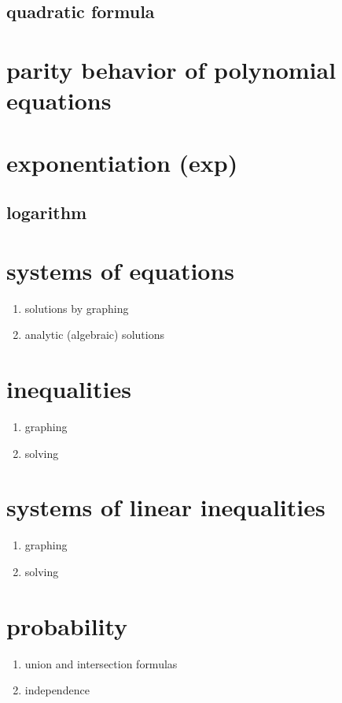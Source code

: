\documentclass[12pt,paper=letter]{scrartcl}
\begin{document}
    \subsection{quadratic formula}


    \section{parity behavior of polynomial equations}


    \section{exponentiation (exp)}

    \subsection{logarithm}


    \section{systems of equations}
    \begin{enumerate}
        \item solutions by graphing
        \item analytic (algebraic) solutions
    \end{enumerate}


    \section{inequalities}
    \begin{enumerate}
        \item graphing
        \item solving
    \end{enumerate}


    \section{systems of linear inequalities}
    \begin{enumerate}
        \item graphing
        \item solving
    \end{enumerate}


    \section{probability}
    \begin{enumerate}
        \item union and intersection formulas
        \item independence
    \end{enumerate}
\end{document}

